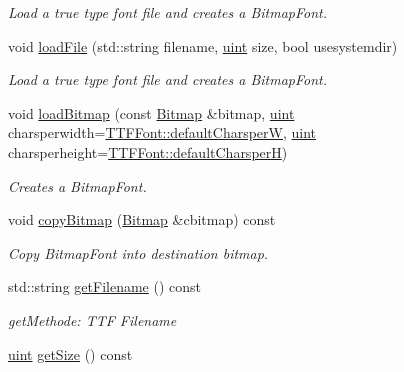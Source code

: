 \begin{DoxyCompactItemize}
\begin{DoxyCompactList}\small\item\em Load a true type font file and creates a BitmapFont. \item\end{DoxyCompactList}\item 
void \hyperlink{class_f2_c_1_1_t_t_f_font_a4b20ef668fecac661800bef0439aea09}{loadFile} (std::string filename, \hyperlink{namespace_f2_c_a58be2bac9eb3e3c99cb41b6008bf4fae}{uint} size, bool usesystemdir)
\begin{DoxyCompactList}\small\item\em Load a true type font file and creates a BitmapFont. \item\end{DoxyCompactList}\item 
void \hyperlink{class_f2_c_1_1_t_t_f_font_af7089297604047a91be0cef914aaa755}{loadBitmap} (const \hyperlink{class_f2_c_1_1_bitmap}{Bitmap} \&bitmap, \hyperlink{namespace_f2_c_a58be2bac9eb3e3c99cb41b6008bf4fae}{uint} charsperwidth=\hyperlink{class_f2_c_1_1_t_t_f_font_afd75a577433ed3f08eafabe9c49718a0}{TTFFont::defaultCharsperW}, \hyperlink{namespace_f2_c_a58be2bac9eb3e3c99cb41b6008bf4fae}{uint} charsperheight=\hyperlink{class_f2_c_1_1_t_t_f_font_a14b235548ed14123b78d4436956d9639}{TTFFont::defaultCharsperH})
\begin{DoxyCompactList}\small\item\em Creates a BitmapFont. \item\end{DoxyCompactList}\item 
void \hyperlink{class_f2_c_1_1_t_t_f_font_afbbfad00d11e781919bd9b88595220c1}{copyBitmap} (\hyperlink{class_f2_c_1_1_bitmap}{Bitmap} \&cbitmap) const 
\begin{DoxyCompactList}\small\item\em Copy BitmapFont into destination bitmap. \item\end{DoxyCompactList}\item 
\hypertarget{class_f2_c_1_1_t_t_f_font_a973eca55478db87c39fb814fcc232ac6}{
std::string \hyperlink{class_f2_c_1_1_t_t_f_font_a973eca55478db87c39fb814fcc232ac6}{getFilename} () const }
\label{class_f2_c_1_1_t_t_f_font_a973eca55478db87c39fb814fcc232ac6}

\begin{DoxyCompactList}\small\item\em getMethode: TTF Filename \item\end{DoxyCompactList}\item 
\hypertarget{class_f2_c_1_1_t_t_f_font_ac16efd7c2834027475a64619e965f544}{
\hyperlink{namespace_f2_c_a58be2bac9eb3e3c99cb41b6008bf4fae}{uint} \hyperlink{class_f2_c_1_1_t_t_f_font_ac16efd7c2834027475a64619e965f544}{getSize} () const }
\label{class_f2_c_1_1_t_t_f_font_ac16efd7c2834027475a64619e965f544}


\end{DoxyCompactItemize}
